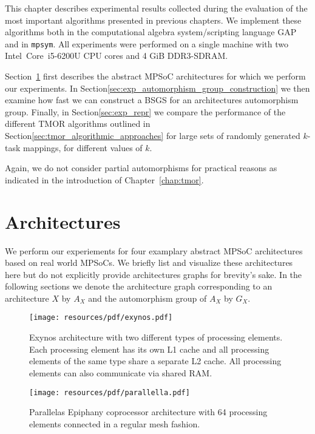 This chapter describes experimental results collected during the evaluation of
the most important algorithms presented in previous chapters.  We implement
these algorithms both in the computational algebra system/scripting language
GAP~\cite{GAP4} and in \texttt{mpsym}. All experiments were performed on a
single machine with two Intel\textregistered\ Core\texttrademark\ i5-6200U CPU
cores and 4 GiB DDR3-SDRAM.

Section~\ref{sec:exp_mpsoc_architectures} first describes the abstract MPSoC
architectures for which we perform our experiments. In
Section\ref{sec:exp_automorphism_group_construction} we then examine how fast
we can construct a BSGS for an architectures automorphism group. Finally, in
Section\ref{sec:exp_repr} we compare the performance of the different TMOR
algorithms outlined in Section\ref{sec:tmor_algorithmic_approaches} for large
sets of randomly generated $k$-task mappings, for different values of $k$.

Again, we do not consider partial automorphisms for practical reasons as
indicated in the introduction of Chapter~\ref{chap:tmor}.

\section{Architectures}
\label{sec:exp_mpsoc_architectures}

We perform our experiements for four examplary abstract MPSoC architectures
based on real world MPSoCs. We briefly list and visualize these architectures
here but do not explicitly provide architectures graphs for brevity's sake.  In
the following sections we denote the architecture graph corresponding to an
architecture $X$ by $A_X$ and the automorphism group of $A_X$ by $G_X$.

\begin{figure}
  \centering
    \texttt{[image: resources/pdf/exynos.pdf]}
  \caption{Exynos architecture with two different types of processing elements.
           Each processing element has its own L1 cache and all processing
           elements of the same type share a separate L2 cache. All processing
           elements can also communicate via shared RAM.}
  \label{fig:exynos}
\end{figure}

\begin{figure}
  \centering
    \texttt{[image: resources/pdf/parallella.pdf]}
  \caption{Parallelas Epiphany coprocessor architecture with 64 processing
           elements connected in a regular mesh fashion.}
  \label{fig:parallella}
\end{figure}

